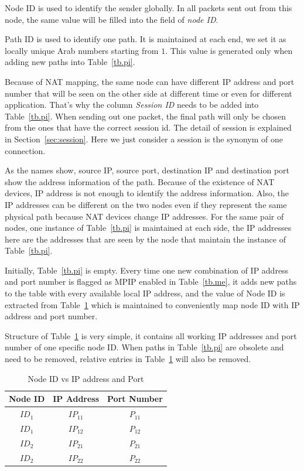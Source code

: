 Node ID is used to identify the sender globally. In all packets sent out from this node, the same value will be filled into the field of \emph{node ID}.

Path ID is used to identify one path. It is maintained at each end, we set it as locally unique Arab numbers starting from $1$. This value is generated only when adding new paths into Table~\ref{tb.pi}. 

Because of NAT mapping, the same node can have different IP address and port number that will be seen on the other side at different time or even for different application. That's why the column \emph{Session ID} needs to be added into Table~\ref{tb.pi}. When sending out one packet, the final path will only be chosen from the ones that have the correct session id. The detail of session is explained in Section~\ref{sec:session}. Here we just consider a session is the synonym of one connection.

As the names show, source IP, source port, destination IP and destination port show the address information of the path. Because of the existence of NAT devices, IP address is not enough to identify the address information. Also, the IP addresses can be different on the two nodes even if they represent the same physical path because NAT devices change IP addresses. For the same pair of nodes, one instance of Table~\ref{tb.pi} is maintained at each side, the IP addresses here are the addresses that are seen by the node that maintain the instance of Table~\ref{tb.pi}.

Initially, Table~\ref{tb.pi} is empty. Every time one new combination of IP address and port number is flagged as MPIP enabled in Table~\ref{tb.me}, it adds new paths to the table with every available local IP address, and the value of Node ID is extracted from Table~\ref{tb.wi} which is maintained to conveniently map node ID with IP address and port number. 

Structure of Table~\ref{tb.wi} is very simple, it contains all working IP addresses and port number of one specific node ID. When paths in Table~\ref{tb.pi} are obsolete and need to be removed, relative entries in Table~\ref{tb.wi} will also be removed.

\begin{table}[htbp]
\caption{\label{tb.wi}Node ID vs IP address and Port}
\centering
\begin{tabular}{|c|c|c|}
\hline
 Node ID  & IP Address & Port Number\\
\hline
${ID}_{1}$&${IP}_{11}$&${P}_{11}$ \\
\hline
${ID}_{1}$&${IP}_{12}$&${P}_{12}$ \\
\hline
${ID}_{2}$&${IP}_{21}$&${P}_{21}$ \\
\hline
${ID}_{2}$&${IP}_{22}$&${P}_{22}$ \\
\hline
\end{tabular}
\end{table}


